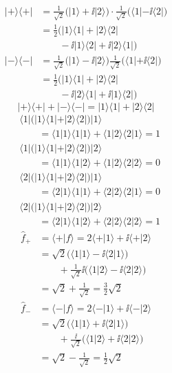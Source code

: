 \begin{align*}
  |+\rangle\langle+|&=\frac{1}{\sqrt{2}}\bigl(|1\rangle+\ii|2\rangle\bigr)\cdot\frac{1}{\sqrt{2}}\bigl(\langle1|-\ii\langle2|\bigr)\\
  &=\frac{1}{2}\bigl(|1\rangle\langle1|+|2\rangle\langle2|\\
  &\qquad-\ii|1\rangle\langle2|+\ii|2\rangle\langle1|\bigr)\\
  |-\rangle\langle-|&=\frac{1}{\sqrt{2}}\bigl(|1\rangle-\ii|2\rangle\bigr)\frac{1}{\sqrt{2}}\bigl(\langle1|+\ii\langle2|\bigr)\\
  &=\frac{1}{2}\bigl(|1\rangle\langle1|+|2\rangle\langle2|\\
  &\qquad-\ii|2\rangle\langle1|+\ii|1\rangle\langle2|\bigr)
\end{align*}
\[
  |+\rangle\langle+|+|-\rangle\langle-|=|1\rangle\langle1|+|2\rangle\langle2|
\]
\begin{align*}
  &\langle1|\bigl(|1\rangle\langle1|+|2\rangle\langle2|\bigr)|1\rangle\\
  &\qquad=\langle1|1\rangle\langle1|1\rangle+\langle1|2\rangle\langle2|1\rangle=1\\
  &\langle1|\bigl(|1\rangle\langle1|+|2\rangle\langle2|\bigr)|2\rangle\\
  &\qquad=\langle1|1\rangle\langle1|2\rangle+\langle1|2\rangle\langle2|2\rangle=0\\
  &\langle2|\bigl(|1\rangle\langle1|+|2\rangle\langle2|\bigr)|1\rangle\\
  &\qquad=\langle2|1\rangle\langle1|1\rangle+\langle2|2\rangle\langle2|1\rangle=0\\
  &\langle2|\bigl(|1\rangle\langle1|+|2\rangle\langle2|\bigr)|2\rangle\\
  &\qquad=\langle2|1\rangle\langle1|2\rangle+\langle2|2\rangle\langle2|2\rangle=1
\end{align*}
\begin{align*}
  \hat{f}_{+}&=\langle+|f\rangle=2\langle+|1\rangle+\ii\langle+|2\rangle\\
  &=\sqrt{2}\bigl(\langle1|1\rangle-\ii\langle2|1\rangle\bigr)\\
  &\qquad+\frac{1}{\sqrt{2}}\ii\bigl(\langle1|2\rangle-\ii\langle2|2\rangle\bigr)\\
  &=\sqrt{2}+\frac{1}{\sqrt{2}}=\frac{3}{2}\sqrt{2}\\
  \hat{f}_{-}&=\langle-|f\rangle=2\langle-|1\rangle+\ii\langle-|2\rangle\\
  &=\sqrt{2}\bigl(\langle1|1\rangle+\ii\langle2|1\rangle\bigr)\\
  &\qquad+\frac{\ii}{\sqrt{2}}\bigl(\langle1|2\rangle+\ii\langle2|2\rangle\bigr)\\
  &=\sqrt{2}-\frac{1}{\sqrt{2}}=\frac{1}{2}\sqrt{2}
\end{align*}
